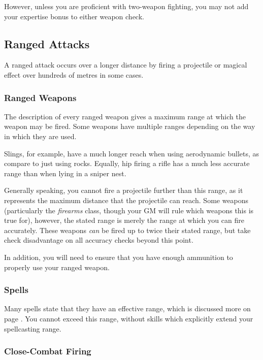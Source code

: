 However, unless you are proficient with two-weapon fighting, you may not add your expertise bonus to either weapon check. 




\subsection{Ranged Attacks}

A ranged attack occurs over a longer distance by firing a projectile or magical effect over hundreds of metres in some cases. 

\subsubsection{Ranged Weapons}

The description of every ranged weapon gives a maximum range at which the weapon may be fired. Some weapons have multiple ranges depending on the way in which they are used. 

Slings, for example, have a much longer reach when using aerodynamic bullets, as compare to just using rocks. Equally, hip firing a rifle has a much less accurate range than when lying in a sniper nest. 

Generally speaking, you cannot fire a projectile further than this range, as it represents the maximum distance that the projectile can reach. Some weapons (particularly the {\it firearms} class, though your GM will rule which weapons this is true for), however, the stated range is merely the range at which you can fire accurately. These weapons {\it can} be fired up to twice their stated range, but take check disadvantage on all accuracy checks beyond this point. 

In addition, you will need to ensure that you have enough ammunition to properly use your ranged weapon.
\subsubsection{Spells}

Many spells state that they have an effective range, which is discussed more on page \pageref{S:Range}. You cannot exceed this range, without skills which explicitly extend your spellcasting range. 

\subsubsection{Close-Combat Firing}

